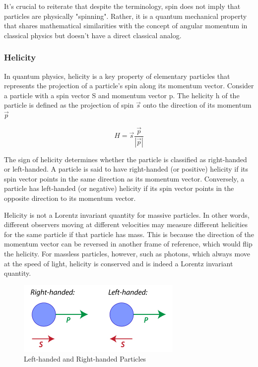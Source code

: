 It's crucial to reiterate that despite the terminology, spin does not imply that particles are physically "spinning". Rather, it is a quantum mechanical property that shares mathematical similarities with the concept of angular momentum in classical physics but doesn't have a direct classical analog.

\subsubsection{Helicity}

In quantum physics, helicity is a key property of elementary particles that represents the projection of a particle's spin along its momentum vector. Consider a particle with a spin vector S and momentum vector p. The helicity h of the particle is defined as the projection of spin $\Vec{s}$ onto the direction of its momentum $\Vec{p}$

\begin{equation}
    H = \Vec{s}\frac{\Vec{p}}{|\Vec{p}|}
\end{equation}

The sign of helicity determines whether the particle is classified as right-handed or left-handed. A particle is said to have right-handed (or positive) helicity if its spin vector points in the same direction as its momentum vector. Conversely, a particle has left-handed (or negative) helicity if its spin vector points in the opposite direction to its momentum vector. 

Helicity is not a Lorentz invariant quantity for massive particles. In other words, different observers moving at different velocities may measure different helicities for the same particle if that particle has mass. This is because the direction of the momentum vector can be reversed in another frame of reference, which would flip the helicity. For massless particles, however, such as photons, which always move at the speed of light, helicity is conserved and is indeed a Lorentz invariant quantity.


\begin{figure}
    \centering
    \includegraphics{images/chap2/rl_handed_particles.png}
    \caption{Left-handed and Right-handed Particles}
    \label{fig:left_right_handed_particles}
\end{figure}

